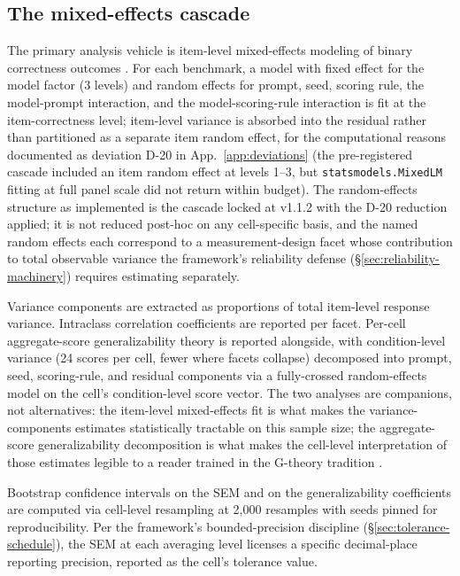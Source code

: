 \documentclass[11pt]{article}
\begin{document}
\subsection{The mixed-effects cascade}
\label{sec:design-cascade}

The primary analysis vehicle is item-level mixed-effects modeling
of binary correctness outcomes
\citep{brennan2001gtheory, cronbach1951alpha}. For each benchmark,
a model with fixed effect for the model factor (3 levels) and
random effects for prompt, seed, scoring rule, the model-prompt
interaction, and the model-scoring-rule interaction is fit at the
item-correctness level; item-level variance is absorbed into the
residual rather than partitioned as a separate item random effect,
for the computational reasons documented as deviation D-20 in
App.~\ref{app:deviations} (the pre-registered cascade included an
item random effect at levels 1--3, but \texttt{statsmodels.MixedLM}
fitting at full panel scale did not return within budget). The
random-effects structure as implemented is the cascade locked at
v1.1.2 with the D-20 reduction applied; it is not reduced post-hoc
on any cell-specific basis, and the named random effects each
correspond to a measurement-design facet whose contribution to
total observable variance the framework's reliability defense
(§\ref{sec:reliability-machinery}) requires estimating separately.

Variance components are extracted as proportions of total
item-level response variance. Intraclass correlation coefficients
are reported per facet. Per-cell aggregate-score generalizability
theory is reported alongside, with condition-level variance (24
scores per cell, fewer where facets collapse) decomposed into
prompt, seed, scoring-rule, and residual components via a
fully-crossed random-effects model on the cell's condition-level
score vector. The two analyses are companions, not alternatives:
the item-level mixed-effects fit is what makes the
variance-components estimates statistically tractable on this
sample size; the aggregate-score generalizability decomposition is
what makes the cell-level interpretation of those estimates legible
to a reader trained in the G-theory tradition
\citep{shrout1979icc, cronbach1951alpha}.

Bootstrap confidence intervals on the SEM and on the
generalizability coefficients are computed via cell-level
resampling at 2,000 resamples with seeds pinned for reproducibility.
Per the framework's bounded-precision discipline
(§\ref{sec:tolerance-schedule}), the SEM at each averaging level
licenses a specific decimal-place reporting precision, reported as
the cell's tolerance value.
\end{document}

